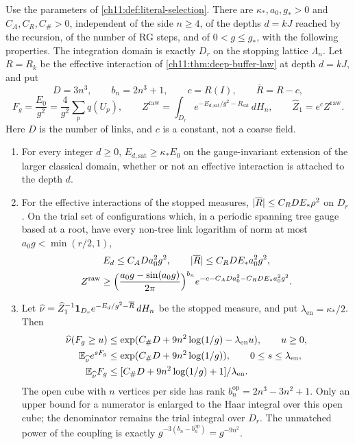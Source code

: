 \begin{theorem}\label{ch11:thm:terminal-anchor}
Use the parameters of \cref{ch11:def:literal-selection}. There are $\kappa_*,a_0,g_*>0$ and $C_A,C_R,C_\#>0$, independent of the side $n\ge4$, of the depths $d=kJ$ reached by the recursion, of the number of RG steps, and of $0<g\le g_*$, with the following properties. The integration domain is exactly $D_r$ on the stopping lattice $\Lambda_n$. Let $R=R_k$ be the effective interaction of \cref{ch11:thm:deep-buffer-law} at depth $d=kJ$, and put
\[
 D=3n^3,\qquad b_n=2n^3+1,\qquad c=R(I),\qquad \overline R=R-c,
\]
\[
 F_g=\frac{E_0}{g^2}=\frac4{g^2}\sum_pq(U_p),\qquad
 Z^{\mathrm{raw}}=\int_{D_r}e^{-E_{d,\mathrm{sat}}/g^2-R_{\mathrm{sat}}}\,dH_n,\qquad
 \widehat Z_1=e^cZ^{\mathrm{raw}}.
\]
Here $D$ is the number of links, and $c$ is a constant, not a coarse field.
\begin{enumerate}
\item For every integer $d\ge0$, $E_{d,\mathrm{sat}}\ge\kappa_*E_0$ on the gauge-invariant extension of the larger classical domain, whether or not an effective interaction is attached to the depth $d$.
\item For the effective interactions of the stopped measures, $\lvert \overline R\rvert\le C_RDE_*\rho^2$ on $D_r$. On the trial set of configurations which, in a periodic spanning tree gauge based at a root, have every non-tree link logarithm of norm at most $a_0g<\min(r/2,1)$,
\[
 \begin{gathered}
 E_d\le C_ADa_0^2g^2,\qquad\lvert \overline R\rvert\le C_RDE_*a_0^2g^2,\\
 Z^{\mathrm{raw}}\ge\Bigl(\frac{a_0g-\sin(a_0g)}{2\pi}\Bigr)^{b_n}e^{-c-C_ADa_0^2-C_RDE_*a_0^2g^2}.
 \end{gathered}
\]
\item Let $\widehat\nu=\widehat Z_1^{-1}\mathbf 1_{D_r}e^{-E_d/g^2-\overline R}\,dH_n$ be the stopped measure, and put $\lambda_{\mathrm{en}}=\kappa_*/2$. Then
\[
 \begin{split}
 \widehat\nu(F_g\ge u)&\le\exp(C_\#D+9n^2\log(1/g)-\lambda_{\mathrm{en}}u),\qquad u\ge0,\\
 \mathbb E_{\widehat\nu}e^{sF_g}&\le\exp(C_\#D+9n^2\log(1/g)),\qquad 0\le s\le\lambda_{\mathrm{en}},\\
 \mathbb E_{\widehat\nu}F_g&\le[C_\#D+9n^2\log(1/g)+1]/\lambda_{\mathrm{en}}.
 \end{split}
\]
The open cube with $n$ vertices per side has rank $b_n^{\mathrm{op}}=2n^3-3n^2+1$. Only an upper bound for a numerator is enlarged to the Haar integral over this open cube; the denominator remains the trial integral over $D_r$. The unmatched power of the coupling is exactly $g^{-3(b_n-b_n^{\mathrm{op}})}=g^{-9n^2}$.

\end{enumerate}
\end{theorem}
